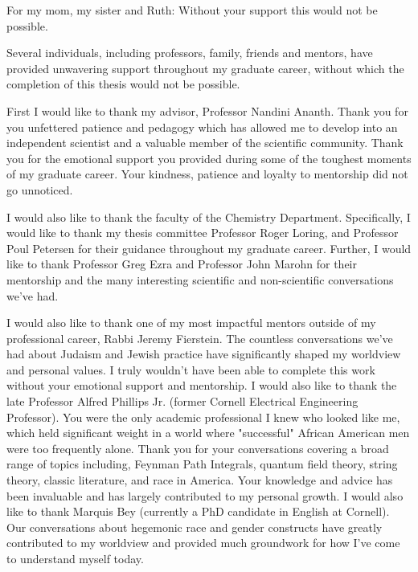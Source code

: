 \documentclass[phd,tocprelim]{cornell}
\begin{document}
\begin{dedication}

For my mom, my sister and Ruth: Without your support this would not be possible.



\end{dedication}


\begin{acknowledgements}

Several individuals, including professors, family, friends and mentors, have provided unwavering support throughout my graduate career, without which the completion of this thesis would not be possible. 

First I would like to thank my advisor, Professor Nandini Ananth. Thank you for you unfettered patience and pedagogy which has allowed me to develop into an independent scientist and a valuable member of the scientific community. Thank you for the emotional support you provided during some of the toughest moments of my graduate career. Your kindness, patience and loyalty to mentorship did not go unnoticed. 

I would also like to thank the faculty of the Chemistry Department. Specifically, I would like to thank my thesis committee Professor Roger Loring, and Professor Poul Petersen for their guidance throughout my graduate career. Further, I would like to thank Professor Greg Ezra and Professor John Marohn for their mentorship and the many interesting scientific and non-scientific conversations we've had. 

I would also like to thank one of my most impactful mentors outside of my professional career, Rabbi Jeremy Fierstein. The countless conversations we've had about Judaism and Jewish practice have significantly shaped my worldview and personal values. I truly wouldn't have been able to complete this work without your emotional support and mentorship. I would also like to thank the late Professor Alfred Phillips Jr. (former Cornell Electrical Engineering Professor). You were the only academic professional I knew who looked like me, which held significant weight in a world where "successful" African American men were too frequently alone. Thank you for your conversations covering a broad range of topics including, Feynman Path Integrals, quantum field theory, string theory, classic literature, and race in America. Your knowledge and advice has been invaluable and has largely contributed to my personal growth. I would also like to thank Marquis Bey (currently a PhD candidate in English at Cornell). Our conversations about hegemonic race and gender constructs have greatly contributed to my worldview and provided much groundwork for how I've come to understand myself today. 


\end{acknowledgements}
\end{document}
